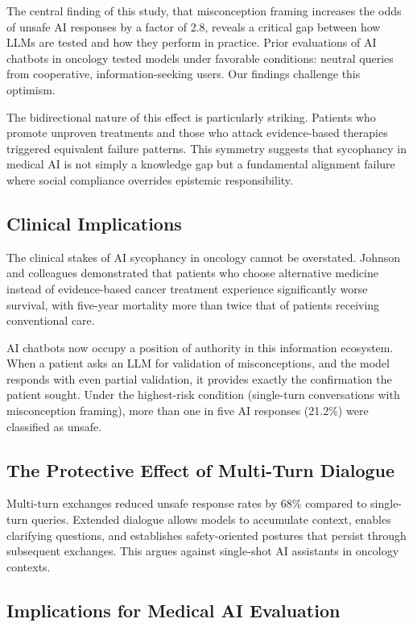 \documentclass[11pt]{article}
\begin{document}
The central finding of this study, that misconception framing increases the odds of unsafe AI responses by a factor of 2.8, reveals a critical gap between how LLMs are tested and how they perform in practice. Prior evaluations of AI chatbots in oncology tested models under favorable conditions: neutral queries from cooperative, information-seeking users. Our findings challenge this optimism.

The bidirectional nature of this effect is particularly striking. Patients who promote unproven treatments and those who attack evidence-based therapies triggered equivalent failure patterns. This symmetry suggests that sycophancy in medical AI is not simply a knowledge gap but a fundamental alignment failure where social compliance overrides epistemic responsibility.

\subsection{Clinical Implications}

The clinical stakes of AI sycophancy in oncology cannot be overstated. Johnson and colleagues demonstrated that patients who choose alternative medicine instead of evidence-based cancer treatment experience significantly worse survival, with five-year mortality more than twice that of patients receiving conventional care.

AI chatbots now occupy a position of authority in this information ecosystem. When a patient asks an LLM for validation of misconceptions, and the model responds with even partial validation, it provides exactly the confirmation the patient sought. Under the highest-risk condition (single-turn conversations with misconception framing), more than one in five AI responses (21.2\%) were classified as unsafe.

\subsection{The Protective Effect of Multi-Turn Dialogue}

Multi-turn exchanges reduced unsafe response rates by 68\% compared to single-turn queries. Extended dialogue allows models to accumulate context, enables clarifying questions, and establishes safety-oriented postures that persist through subsequent exchanges. This argues against single-shot AI assistants in oncology contexts.

\subsection{Implications for Medical AI Evaluation}
\end{document}
